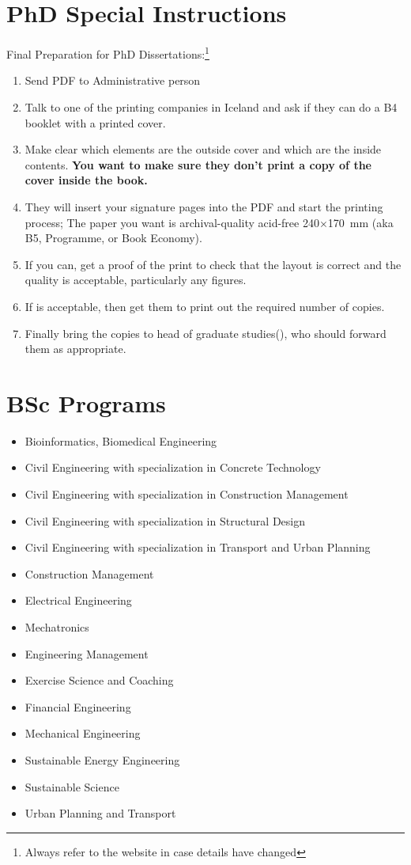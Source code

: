 \section{PhD Special Instructions}
Final Preparation for PhD Dissertations:\footnote{Always refer to the website in case details have changed}
\begin{enumerate}
\item Send PDF to Administrative person \TItvdadmin{}
\item Talk to one of the printing companies in Iceland and ask if they can do a B4 booklet with a printed cover.
\item Make clear which elements are the outside cover and which are the inside contents.
  \textbf{You want to make sure they don't print a copy of the cover inside the book.}
\item They will insert your signature pages into the PDF and start the printing process;
  The paper you want is archival-quality acid-free 240$\times$\SI{170}{\milli\meter} (aka B5, Programme, or Book Economy).
\item If you can, get a proof of the print to check that the layout is correct and the quality is acceptable, particularly any figures.
\item If is acceptable, then get them to print out the required number of copies.
\item Finally bring the copies to head of graduate studies(\TIheadofgrad{}), who should forward them as appropriate.
\end{enumerate}

\section{BSc Programs}
\begin{itemize}
\item Bioinformatics, Biomedical Engineering
\item Civil Engineering with specialization in Concrete Technology
\item Civil Engineering with specialization in Construction Management
\item Civil Engineering with specialization in Structural Design
\item Civil Engineering with specialization in Transport and Urban Planning
\item Construction Management
\item Electrical Engineering
\item Mechatronics
\item Engineering Management
\item Exercise Science and Coaching
\item Financial Engineering
\item Mechanical Engineering
\item Sustainable Energy Engineering
\item Sustainable Science
\item Urban Planning and Transport              
\end{itemize}

